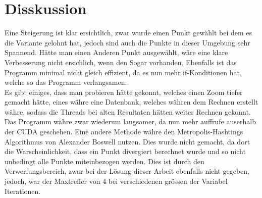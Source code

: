 \section{Disskussion}
Eine Steigerung ist klar ersichtlich, zwar wurde einen Punkt gewählt bei dem es die Variante gelohnt hat, jedoch sind auch die Punkte in dieser Umgebung sehr Spannend. Hätte man einen Anderen Punkt ausgewählt, wäre eine klare Verbesserung nicht ersichlich, wenn den Sogar vorhanden. Ebenfalls ist das Programm minimal nicht gleich effizient, da es nun mehr if-Konditionen hat, welche so das Programm verlangsamen.\\
Es gibt einiges, dass man probieren hätte gekonnt, welches einen Zoom tiefer gemacht hätte, eines währe eine Datenbank, welches währen dem Rechnen erstellt währe, sodass die Threads bei alten Resultaten hätten weiter Rechnen gekonnt. Das Programm währe zwar wiederum langsamer, da nun mehr auffrufe auserhalb der CUDA geschehen. Eine andere Methode währe den Metropolis-Hashtings Algorithmus von Alexander Boswell nutzen. Dies wurde nicht gemacht, da dort die Warscheinlichkeit, dass ein Punkt divergiert berechnet wurde und so nicht unbedingt alle Punkte miteinbezogen werden. Dies ist durch den Verwerfungsbereich, zwar bei der Lösung dieser Arbeit ebenfalls nicht gegeben, jedoch, war der Maxtreffer von 4 bei verschiedenen grössen der Variabel Iterationen. 